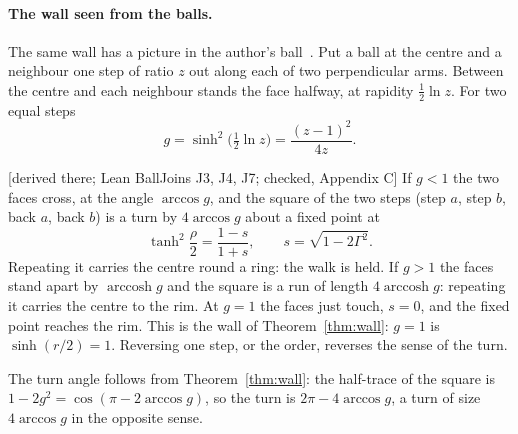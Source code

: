 \documentclass[11pt]{article}
\theoremstyle{definition}\newtheorem{hypothesis}{Hypothesis}\newtheorem{prediction}{Prediction}
\theoremstyle{remark}\newtheorem{remark}[theorem]{Remark}
\newcommand{\grade}[1]{\textsf{\small[#1]}}
\begin{document}
\paragraph{The wall seen from the balls.} The same wall has a picture in the author's ball~\cite{TwoTrees,Mixer}. Put a ball at the centre and a neighbour one step of ratio $z$ out along each of two perpendicular arms. Between the centre and each neighbour stands the face halfway, at rapidity $\tfrac12\ln z$. For two equal steps
\begin{equation}
g=\sinh^2\big(\tfrac12\ln z\big)=\frac{(z-1)^2}{4z}.
\end{equation}
\begin{proposition}\label{prop:turnrun}\grade{derived there; Lean BallJoins J3, J4, J7; checked, Appendix C}
If $g<1$ the two faces cross, at the angle $\arccos g$, and the square of the two steps (step $a$, step $b$, back $a$, back $b$) is a turn by $4\arccos g$ about a fixed point at
\begin{equation}
\tanh^2\frac{\rho}{2}=\frac{1-s}{1+s},\qquad s=\sqrt{1-2\Gamma^2}.
\end{equation}
Repeating it carries the centre round a ring: the walk is held. If $g>1$ the faces stand apart by $\operatorname{arccosh}g$ and the square is a run of length $4\operatorname{arccosh}g$: repeating it carries the centre to the rim. At $g=1$ the faces just touch, $s=0$, and the fixed point reaches the rim. This is the wall of Theorem~\ref{thm:wall}: $g=1$ is $\sinh(r/2)=1$. Reversing one step, or the order, reverses the sense of the turn.
\end{proposition}
The turn angle follows from Theorem~\ref{thm:wall}: the half-trace of the square is $1-2g^2=\cos(\pi-2\arccos g)$, so the turn is $2\pi-4\arccos g$, a turn of size $4\arccos g$ in the opposite sense.
\end{document}
